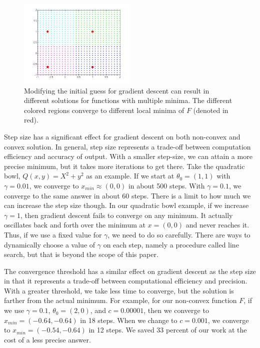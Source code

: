 \documentclass[11pt]{article}   %
\theoremstyle{plain}
\begin{document}
\begin{figure}[h!]\label{initial_guesses}
  \caption{Modifying the initial guess for gradient descent can result in different solutions for functions with multiple minima. The different colored regions converge to different local minima of $F$ (denoted in red). }
  \centering
    \includegraphics[width=0.5\textwidth]{figures/1_2_start_guesses.jpg}
\end{figure}

Step size has a significant effect for gradient descent on both non-convex and convex solution. In general, step size represents a trade-off between computation efficiency and accuracy of output. With a smaller step-size, we can attain a more precise minimum, but it takes more iterations to get there. Take the quadratic bowl, $Q(x,y) = X^2 + y^2$ as an example. If we start at $\theta_0 = (1,1)$ with $\gamma = 0.01$, we converge to $x_{min} \approx (0,0)$ in about 500 steps. With $\gamma = 0.1$, we converge to the same answer in about 60 steps. There is a limit to how much we can increase the step size though. In our quadratic bowl example, if we increase $\gamma = 1$, then gradient descent fails to converge on any minimum. It actually oscillates back and forth over the minimum at $x = (0,0)$ and never reaches it. Thus, if we use a fixed value for $\gamma$, we need to do so carefully. There are ways to dynamically choose a value of $\gamma$ on each step, namely a procedure called line search, but that is beyond the scope of this paper.

The convergence threshold has a similar effect on gradient descent as the step size in that it represents a trade-off between computational efficiency and precision. With a greater threshold, we take less time to converge, but the solution is farther from the actual minimum. For example, for our non-convex function $F$, if we use $\gamma = 0.1$,  $\theta_0 = (2,0)$, and $c = 0.00001$, then we converge to $x_{min} = (-0.64,-0.64)$ in 18 steps. When we change to $c = 0.001$, we converge to $x_{min} = (-0.54,-0.64)$ in 12 steps. We saved 33 percent of our work at the cost of a less precise answer.
\end{document}
